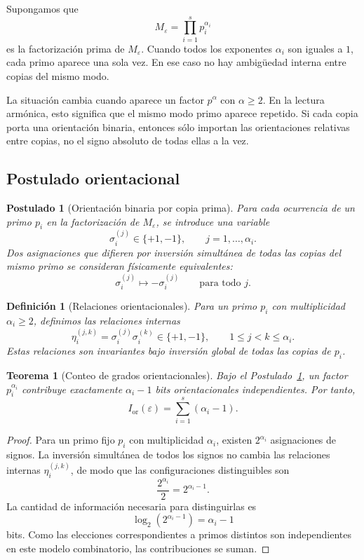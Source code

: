 \documentclass[11pt]{article}
\newtheorem{postulado}{Postulado}
\newtheorem{definicion}{Definición}
\newtheorem{teorema}{Teorema}
\newcommand{\Ior}{I_{\mathrm{or}}}
\begin{document}
Supongamos que
\[
M_\varepsilon=\prod_{i=1}^{s}p_i^{\alpha_i}
\]
es la factorización prima de $M_\varepsilon$. Cuando todos los exponentes $\alpha_i$ son iguales a $1$, cada primo aparece una sola vez. En ese caso no hay ambigüedad interna entre copias del mismo modo.

La situación cambia cuando aparece un factor $p^\alpha$ con $\alpha\geq2$. En la lectura armónica, esto significa que el mismo modo primo aparece repetido. Si cada copia porta una orientación binaria, entonces sólo importan las orientaciones relativas entre copias, no el signo absoluto de todas ellas a la vez.

\subsection{Postulado orientacional}

\begin{postulado}[Orientación binaria por copia prima]\label{post:orientacion}
Para cada ocurrencia de un primo $p_i$ en la factorización de $M_\varepsilon$, se introduce una variable
\[
\sigma_i^{(j)}\in\{+1,-1\},
\qquad
j=1,\ldots,\alpha_i.
\]
Dos asignaciones que difieren por inversión simultánea de todas las copias del mismo primo se consideran físicamente equivalentes:
\[
\sigma_i^{(j)}\mapsto -\sigma_i^{(j)}
\qquad
\text{para todo }j.
\]
\end{postulado}

\begin{definicion}[Relaciones orientacionales]\label{def:relaciones}
Para un primo $p_i$ con multiplicidad $\alpha_i\geq2$, definimos las relaciones internas
\[
\eta_i^{(j,k)}=\sigma_i^{(j)}\sigma_i^{(k)}
\in\{+1,-1\},
\qquad
1\leq j<k\leq\alpha_i.
\]
Estas relaciones son invariantes bajo inversión global de todas las copias de $p_i$.
\end{definicion}

\begin{teorema}[Conteo de grados orientacionales]\label{th:conteo}
Bajo el Postulado~\ref{post:orientacion}, un factor $p_i^{\alpha_i}$ contribuye exactamente $\alpha_i-1$ bits orientacionales independientes. Por tanto,
\[
\boxed{\Ior(\varepsilon)=\sum_{i=1}^{s}(\alpha_i-1).}
\]
\end{teorema}

\begin{proof}
Para un primo fijo $p_i$ con multiplicidad $\alpha_i$, existen $2^{\alpha_i}$ asignaciones de signos. La inversión simultánea de todos los signos no cambia las relaciones internas $\eta_i^{(j,k)}$, de modo que las configuraciones distinguibles son
\[
\frac{2^{\alpha_i}}{2}=2^{\alpha_i-1}.
\]
La cantidad de información necesaria para distinguirlas es
\[
\log_2(2^{\alpha_i-1})=\alpha_i-1
\]
bits. Como las elecciones correspondientes a primos distintos son independientes en este modelo combinatorio, las contribuciones se suman.
\end{proof}
\end{document}
